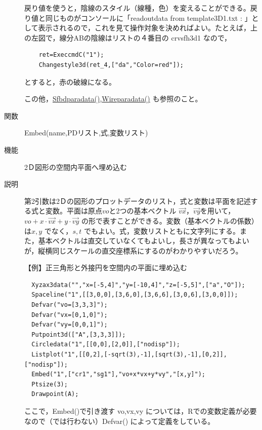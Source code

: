 \documentclass[papersize,a4paper,12pt,uplatex]{jsarticle}
\begin{document}
\begin{description}
戻り値を使うと，陰線のスタイル（線種，色）を変えることができる。戻り値と同じものがコンソールに「readoutdata from template3D1.txt : 」として表示されるので，これを見て操作対象を決めればよい。たとえば，上の左図で，線分ABの陰線はリストの４番目の crvsfh3d1 なので，

\begin{verbatim}
    ret=ExeccmdC("1");
    Changestyle3d(ret_4,["da","Color=red"]);
\end{verbatim}

とすると，赤の破線になる。

\hspace{20mm} 

この他，\hyperlink{sfbdparadata}{Sfbdparadata()},\hyperlink{wireparadata}{Wireparadata()} も参照のこと。

\vspace{\baselineskip}
\hypertarget{embed}{}
\item[関数]  Embed(name,PDリスト,式,変数リスト)
\item[機能]  2Ｄ図形の空間内平面へ埋め込む
\item[説明]  第2引数は2Ｄの図形のプロットデータのリスト，式と変数は平面を記述する式と変数。平面は原点$vo$と2つの基本ベクトル $\overrightarrow{vx}，\overrightarrow{vy}$を用いて，$vo+x \cdot \overrightarrow{vx}+y \cdot \overrightarrow{vy}$ の形で表すことができる。変数（基本ベクトルの係数）は$x,y$ でなく，$s,t$ でもよい。式，変数リストともに文字列にする。また，基本ベクトルは直交していなくてもよいし，長さが異なってもよいが，縦横同じスケールの直交座標系にするのがわかりやすいだろう。

\vspace{\baselineskip}
【例】正三角形と外接円を空間内の平面に埋め込む
\begin{verbatim}
  Xyzax3data("","x=[-5,4]","y=[-10,4]","z=[-5,5]",["a","O"]);
  Spaceline("1",[[3,0,0],[3,6,0],[3,6,6],[3,0,6],[3,0,0]]);
  Defvar("vo=[3,3,3]");
  Defvar("vx=[0,1,0]");
  Defvar("vy=[0,0,1]");
  Putpoint3d(["A",[3,3,3]]);
  Circledata("1",[[0,0],[2,0]],["nodisp"]);
  Listplot("1",[[0,2],[-sqrt(3),-1],[sqrt(3),-1],[0,2]],["nodisp"]);
  Embed("1",["cr1","sg1"],"vo+x*vx+y*vy","[x,y]");
  Ptsize(3);
  Drawpoint(A);
\end{verbatim}
         \begin{center}  \end{center}

ここで，Embed()で引き渡す vo,vx,vy については，Rでの変数定義が必要なので（\ketcindy では行わない）Defvar() によって定義をしている。


\end{description}
\end{document}
